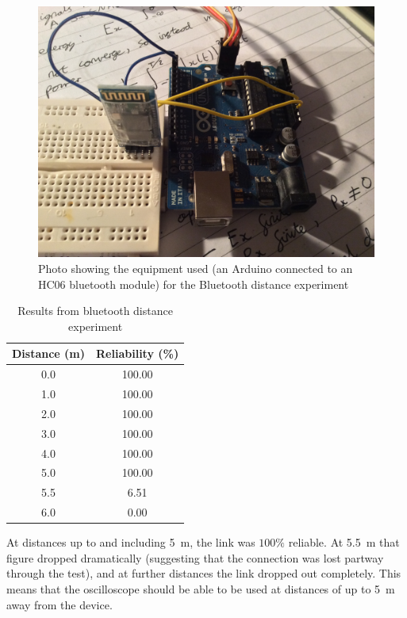 \begin{figure}[H]
  \includegraphics[width=\textwidth]{img/bluetooth/setup.jpg}
  \caption[Bluetooth Experiment Setup]{Photo showing the equipment used (an
    Arduino connected to an HC06 bluetooth module) for the Bluetooth distance
  experiment}
  \label{fig:bluetoothExperimentSetup}
\end{figure}

\begin{table}
  \centering
  \begin{tabular}{SS}
    \toprule
    {Distance (\si{m})} & {Reliability (\%)}\\
    \midrule

    0.0 & 100.00\\
    1.0 & 100.00\\
    2.0 & 100.00\\
    3.0 & 100.00\\
    4.0 & 100.00\\
    5.0 & 100.00\\
    5.5 & 6.51\\
    6.0 & 0.00\\

    \bottomrule
  \end{tabular}
  \caption{Results from bluetooth distance experiment}
  \label{tab:bluetoothData}
\end{table}

At distances up to and including \SI{5}{\m}, the link was $100\%$
reliable. At \SI{5.5}{\m} that figure dropped dramatically (suggesting that the
connection was lost partway through the test), and at further distances the link
dropped out completely. This means that the oscilloscope should be able to be
used at distances of up to \SI{5}{\m} away from the device.

